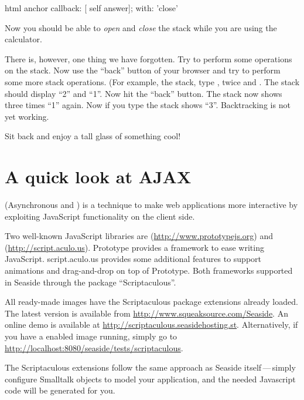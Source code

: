 \documentclass[a4paper,10pt,twoside]{book}
\begin{document}
\begin{code}{}
html anchor
	callback: [ self answer];
	with: 'close'
\end{code}


Now you should be able to \emph{open} and \emph{close} the stack while you are using the calculator.

There is, however, one thing we have forgotten.
Try to perform some operations on the stack.
Now use the ``back'' button of your browser and try to perform some more stack operations.
(For example,  the stack, type ,  twice and \menu {+}.
The stack should display ``2'' and ``1''.
Now hit the ``back'' button.
The stack now shows three times ``1'' again.
Now if you type \menu{+} the stack shows ``3''.
Backtracking is not yet working.


Sit back and enjoy a tall glass of something cool!

\section{A quick look at AJAX}


 (Asynchronous  and ) is a technique to make web applications more interactive by exploiting JavaScript functionality on the client side.

Two well-known JavaScript libraries are  (\url{http://www.prototypejs.org}) and  (\url{http://script.aculo.us}).
Prototype provides a framework to ease writing JavaScript.
script.aculo.us provides some additional features to support animations and drag-and-drop on top of Prototype.
Both frameworks  supported in Seaside through the package ``Scriptaculous''.

All ready-made images have the Scriptaculous package extensions already loaded.
The latest version is available from \url{http://www.squeaksource.com/Seaside}.
An online demo is available at \url{http://scriptaculous.seasidehosting.st}.
Alternatively, if you have a enabled image running, simply go to \url{http://localhost:8080/seaside/tests/scriptaculous}.

The Scriptaculous extensions follow the same approach as Seaside itself\,---\,simply configure Smalltalk objects to model your application, and the needed Javascript code will be generated for you.
\end{document}
